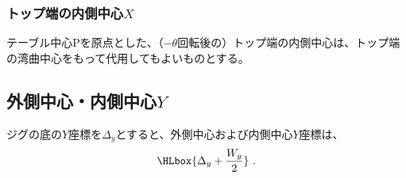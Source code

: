 \subsubsection{トップ端の内側中心\texorpdfstring{$X$}{X}}
テーブル中心Pを原点とした、（$-\theta$回転後の）トップ端の内側中心は、トップ端の湾曲中心をもって代用してもよいものとする。


\subsection{外側中心・内側中心\texorpdfstring{$Y$}{Y}}
ジグの底の$Y$座標を$\Delta_y$とすると、外側中心および内側中心$Y$座標は、
\begin{align*}
  \HLbox{\Delta_y+\frac{W_y}2}\ .
\end{align*}

